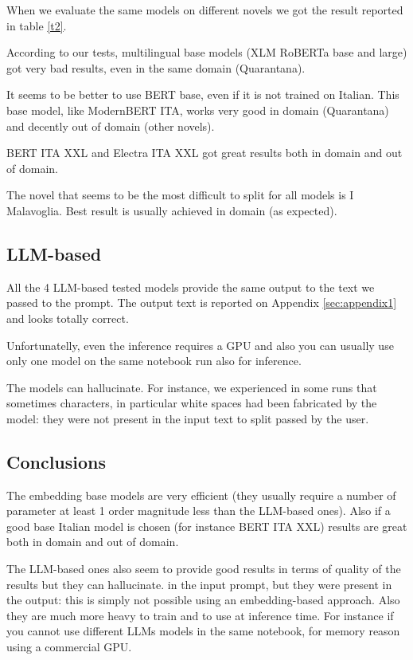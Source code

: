 \documentclass[11pt]{article}
\begin{document}
When we evaluate the same models on different novels we got the
result reported in table \ref{t2}.

According to our tests, multilingual base models (XLM RoBERTa base and large)
got very bad results, even in the same domain (Quarantana).

It seems to be better to use BERT base, even if it is not trained on Italian.
This base model, like ModernBERT ITA, works very good in domain (Quarantana) and
decently out of domain (other novels).

BERT ITA XXL and Electra ITA XXL got great results both in domain and out of domain.

The novel that seems to be the most difficult to split for all models is I Malavoglia.
Best result is usually achieved in domain (as expected).

\subsection{LLM-based}

All the 4 LLM-based tested models provide the same output to the text 
we passed to the prompt. The output text is reported on Appendix \ref{sec:appendix1}
and looks totally correct. 

Unfortunatelly, even the inference requires a GPU and also 
you can usually use only one model on the same notebook run 
also for inference.

The models can hallucinate. For instance, we experienced in some runs that 
sometimes characters, in particular white spaces had been fabricated by the model: they were not present in the input text to split passed by the user.

\subsection{Conclusions}

The embedding base models are very efficient (they usually require a
number of parameter at least 1 order magnitude less than the LLM-based ones).
Also if a good base Italian model is chosen (for instance BERT ITA XXL)
results are great both in domain and out of domain.

The LLM-based ones also seem to provide good results in terms of quality
of the results but they can hallucinate. 
in the input prompt, but they were present in the output: this is simply not possible
using an embedding-based approach.
Also they are much more heavy to train and to use at inference time.
For instance if you cannot use different LLMs models in the same notebook,
for memory reason using a commercial GPU. 
\end{document}
